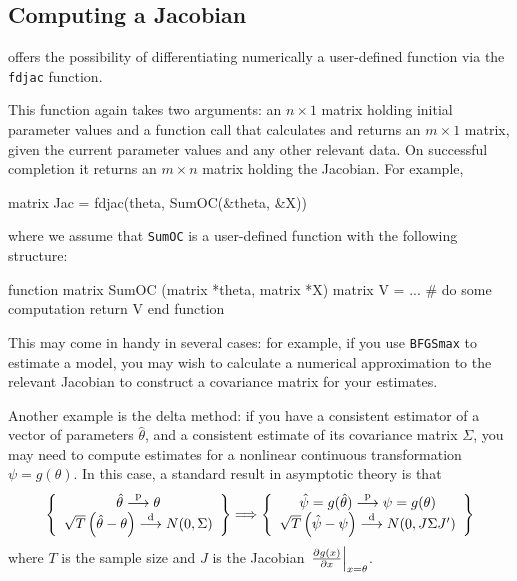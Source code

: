 \subsection{Computing a Jacobian}
\label{sec:fdjac}

 offers the possibility of differentiating numerically a
user-defined function via the \texttt{fdjac} function. 

This function again takes two arguments: an $n \times 1$ matrix
holding initial parameter values and a function call that calculates
and returns an $m \times 1$ matrix, given the current parameter values
and any other relevant data.  On successful completion it returns an
$m \times n$ matrix holding the Jacobian.  For example,
%
\begin{code}
matrix Jac = fdjac(theta, SumOC(&theta, &X))
\end{code}
where we assume that \texttt{SumOC} is a user-defined function with
the following structure:
%
\begin{code}
function matrix SumOC (matrix *theta, matrix *X)
  matrix V = ...  # do some computation
  return V
end function
\end{code}

This may come in handy in several cases: for example, if you use
\texttt{BFGSmax} to estimate a model, you may wish to calculate a
numerical approximation to the relevant Jacobian to construct a
covariance matrix for your estimates.

Another example is the delta method: if you have a consistent
estimator of a vector of parameters $\hat{\theta}$, and a consistent
estimate of its covariance matrix $\Sigma$, you may need to compute
estimates for a nonlinear continuous transformation $\psi =
g(\theta)$. In this case, a standard result in asymptotic theory is
that
\[
\left\{
    \begin{array}{c}
      \hat{\theta} \stackrel{\mathrm{p}}{\longrightarrow} \theta \\ 
      \sqrt{T} \left( \hat{\theta} - \theta \right) \stackrel{\mathrm{d}}{\longrightarrow} N(0, \Sigma)
    \end{array}
\right\}
    \Longrightarrow
\left\{
    \begin{array}{c}
      \hat{\psi} = g(\hat{\theta}) \stackrel{\mathrm{p}}{\longrightarrow} \psi = g(\theta) \\ 
      \sqrt{T} \left( \hat{\psi} - \psi \right) \stackrel{\mathrm{d}}{\longrightarrow} N(0, J
      \Sigma J')
    \end{array}
\right\}
\]
where $T$ is the sample size and $J$ is the Jacobian
$\left.\frac{\partial g(x)}{\partial x}\right|_{x = \theta}$.

